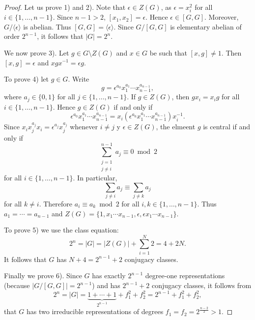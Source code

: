\begin{proof}
    Let us prove 1) and 2). Note that $\epsilon\in Z(G)$, as
    $\epsilon=x_i^2$ for all 
	$i\in\{1,\dots,n-1\}$. Since $n-1>2$, $[x_1,x_2]=\epsilon$. Hence 
	$\epsilon\in [G,G]$. Moreover, $G/\langle\epsilon\rangle$ is abelian. Thus 
	$[G,G]=\langle \epsilon\rangle$. Since $G/[G,G]$ is elementary 
	abelian of order 
	$2^{n-1}$, it follows that 
	$|G|=2^n$. 

	We now prove 3). Let $g\in G\setminus Z(G)$ and 
	$x\in G$ be such that $[x,g]\ne 1$. Then $[x,g]=\epsilon$ and 
	$xgx^{-1}=\epsilon g$. 

	To prove 4) let $g\in G$. Write
	\[
		g=\epsilon^{a_0}x_1^{a_1}\cdots x_{n-1}^{a_{n-1}},
	\]
	where $a_j\in\{0,1\}$ for all $j\in\{1,\dots,n-1\}$. 
	If $g\in Z(G)$, then $gx_i=x_ig$ for all $i\in\{1,\dots,n-1\}$. Hence 
	$g\in Z(G)$ if and only if 
	\[
		\epsilon^{a_0}x_1^{a_1}\cdots x_{n-1}^{a_{n-1}}=x_i(\epsilon^{a_0}x_1^{a_1}\cdots x_{n-1}^{a_{n-1}})x_i^{-1}.
	\]
	Since $x_ix_j^{a_j}x_i=\epsilon^{a_j}x_j^{a_j}$ 
	whenever $i\ne j$ y $\epsilon\in Z(G)$, the elmeent $g$ is 
	central if and only if 
	\[
		\sum_{\substack{j=1\\j\ne i}}^{n-1}a_j\equiv 0\bmod 2
	\]
	for all $i\in\{1,\dots,n-1\}$. In particular, 
	\[
	\sum_{j\ne i}a_j\equiv \sum_{j\ne k}a_j
	\]
	for all $k\ne i$. Therefore $a_i\equiv a_k\bmod 2$ for all 
	$i,k\in\{1,\dots,n-1\}$. Thus $a_1=\cdots=a_{n-1}$ and  
	$Z(G)=\{1,x_1\cdots x_{n-1},\epsilon,\epsilon x_1\cdots
	x_{n-1}\}$. 
	
    To prove 5) we use the class equation:
    \[
		2^n=|G|=|Z(G)|+\sum_{i=1}^N2=4+2N. 
	\]
	It follows that $G$ has $N+4=2^{n-1}+2$ conjugacy classes.
	
	Finally we prove 6). 
	Since $G$ 
	has exactly $2^{n-1}$ degree-one representations (because 
	$|G/[G,G]|=2^{n-1}$) and 
	has $2^{n-1}+2$ conjugacy classes, 
	it follows from 
	\[
		2^n=|G|=\underbrace{1+\cdots+1}_{2^{n-1}}+f_1^2+f_2^2=2^{n-1}+f_1^2+f_2^2,
	\]
	that $G$ has two irreducible representations
	of degrees $f_1=f_2=2^{\frac{n-2}{2}}>1$. 
\end{proof}

